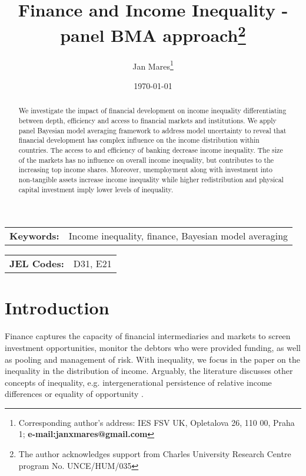 \documentclass[a4paper,11pt]{article}
\title{Finance and Income Inequality - panel BMA approach\thanks{The author acknowledges support from Charles University Research Centre program No. UNCE/HUM/035}}
\author[a]{Jan Mares\footnote{\footnotesize Corresponding author's address: IES FSV UK, Opletalova 26, 110 00, Praha 1; \textbf{e-mail:janxmares@gmail.com}}}
\affil[a]{Charles University, Prague}
\date{\today}
\begin{document}
\def\sym#1{\ifmmode^{#1}\else\(^{#1}\)\fi} %

\maketitle

\thispagestyle{empty}
\begin{abstract}
    We investigate the impact of financial development on income inequality differentiating between depth, efficiency and access to financial markets and institutions. We apply panel Bayesian model averaging framework to address model uncertainty to reveal that financial development has complex influence on the income distribution within countries. The access to and efficiency of banking decrease income inequality. The size of the markets has no influence on overall income inequality, but contributes to the increasing top income shares. Moreover, unemployment along with investment into non-tangible assets increase income inequality while higher redistribution and physical capital investment imply lower levels of inequality.
\end{abstract}

\bigskip

\begin{tabular}{p{0.25\hsize}p{0.6\hsize}} %
\textbf{Keywords:} & Income inequality, finance, Bayesian model averaging
\end{tabular}

\bigskip

\begin{tabular}{p{0.25\hsize}p{0.6\hsize}}
\textbf{JEL Codes:} & D31, E21\\
\end{tabular}

\clearpage
\setcounter{page}{1}

\section{Introduction}

Finance captures the capacity of financial intermediaries and markets to screen investment opportunities, monitor the debtors who were provided funding, as well as pooling and management of risk. With inequality, we focus in the paper on the inequality in the distribution of income. Arguably, the literature discusses other concepts of inequality, e.g. intergenerational persistence of relative income differences or equality of opportunity \citep{demirgucc2009finance}.
\end{document}
